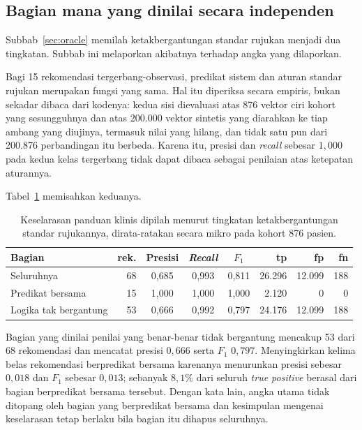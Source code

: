 \subsection{Bagian mana yang dinilai secara independen}
\label{sec:shared-predicate}
Subbab~\ref{sec:oracle} memilah ketakbergantungan standar rujukan menjadi dua tingkatan. Subbab
ini melaporkan akibatnya terhadap angka yang dilaporkan.

Bagi 15 rekomendasi tergerbang-observasi, predikat sistem dan aturan standar rujukan merupakan
fungsi yang sama. Hal itu diperiksa secara empiris, bukan sekadar dibaca dari kodenya: kedua
sisi dievaluasi atas 876 vektor ciri kohort yang sesungguhnya dan atas 200.000 vektor sintetis
yang diarahkan ke tiap ambang yang diujinya, termasuk nilai yang hilang, dan tidak satu pun
dari 200.876 perbandingan itu berbeda. Karena itu, presisi dan \emph{recall} sebesar $1{,}000$
pada kedua kelas tergerbang tidak dapat dibaca sebagai penilaian atas ketepatan aturannya.

Tabel~\ref{tab:shared-predicate} memisahkan keduanya.

\begin{table}[h]
\centering
\caption{Keselarasan panduan klinis dipilah menurut tingkatan ketakbergantungan standar
rujukannya, dirata-ratakan secara mikro pada kohort 876 pasien.}
\label{tab:shared-predicate}
\begin{tabular}{lrcccrrr}
\hline
\textbf{Bagian} & \textbf{rek.} & \textbf{Presisi} & \textbf{\emph{Recall}} & \textbf{$F_1$} &
\textbf{tp} & \textbf{fp} & \textbf{fn} \\
\hline
Seluruhnya            & 68 & 0,685 & 0,993 & 0,811 & 26.296 & 12.099 & 188 \\
Predikat bersama      & 15 & 1,000 & 1,000 & 1,000 & 2.120 & 0 & 0 \\
Logika tak bergantung & 53 & 0,666 & 0,992 & 0,797 & 24.176 & 12.099 & 188 \\
\hline
\end{tabular}
\end{table}

Bagian yang dinilai penilai yang benar-benar tidak bergantung mencakup 53 dari 68 rekomendasi
dan mencatat presisi $0{,}666$ serta $F_1$ $0{,}797$. Menyingkirkan kelima belas rekomendasi
berpredikat bersama karenanya menurunkan presisi sebesar $0{,}018$ dan $F_1$ sebesar $0{,}013$;
sebanyak $8{,}1\%$ dari seluruh \emph{true positive} berasal dari bagian berpredikat bersama
tersebut. Dengan kata lain, angka utama tidak ditopang oleh bagian yang berpredikat bersama
dan kesimpulan mengenai keselarasan tetap berlaku bila bagian itu dihapus seluruhnya.

